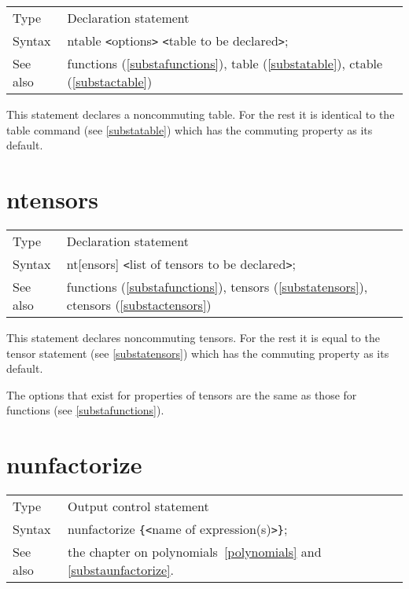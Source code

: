 \noindent \begin{tabular}{ll}
Type & Declaration statement\\
Syntax & ntable {\tt<}options{\tt>} {\tt<}table to be 
declared{\tt>}; \\
See also & functions (\ref{substafunctions}), table (\ref{substatable}),
        ctable (\ref{substactable})
\end{tabular} \vspace{4mm}

\noindent This statement declares a 
noncommuting table. For the 
rest it is identical to the table command (see 
\ref{substatable}) which has the commuting property as its default. 
\vspace{10mm}

 
\section{ntensors}
\label{substantensors}

\noindent \begin{tabular}{ll}
Type & Declaration statement\\
Syntax & nt[ensors] {\tt<}list of tensors to be declared{\tt>}; \\
See also & functions (\ref{substafunctions}), tensors 
            (\ref{substatensors}), ctensors (\ref{substactensors})
\end{tabular} \vspace{4mm}

\noindent This statement declares 
noncommuting tensors. For 
the rest it is equal to the tensor statement (see 
\ref{substatensors}) which has the commuting property as its default.

\noindent The options that exist for properties of tensors are the same as 
those for functions (see \ref{substafunctions}). \vspace{10mm}


\section{nunfactorize}
\label{substanunfactorize}

\noindent \begin{tabular}{ll}
Type & Output control statement\\
Syntax & nunfactorize \verb:{:{\tt<}name of expression(s){\tt>}\verb:}:;
\\ See also & the chapter on polynomials~\ref{polynomials} and 
\ref{substaunfactorize}.
\end{tabular} \vspace{4mm}

